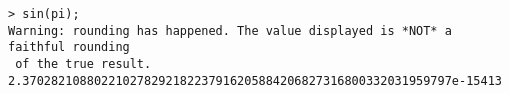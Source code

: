 \begin{center}\begin{minipage}{15cm}\begin{Verbatim}[frame=single]
> sin(pi);
Warning: rounding has happened. The value displayed is *NOT* a faithful rounding
 of the true result.
2.370282108802210278292182237916205884206827316800332031959797e-15413
\end{Verbatim}
\end{minipage}\end{center}

